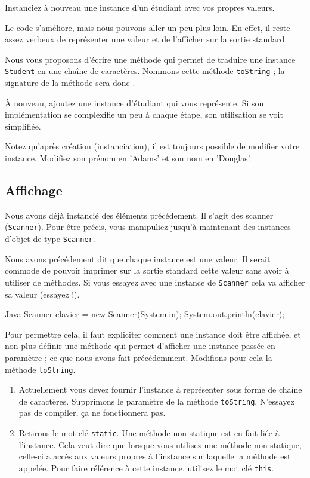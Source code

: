 \documentclass[a4paper,11pt]{article}
\begin{document}

	Instanciez à nouveau une instance d'un étudiant avec vos propres valeurs.

	\bigskip

	Le code s'améliore, mais nous pouvons aller un peu plus loin. En effet, il reste assez verbeux de représenter une valeur et de l'afficher sur la sortie standard.

	Nous vous proposons d'écrire une méthode qui permet de \og traduire\fg{} une
	instance \texttt{Student} en une chaîne de caractères. Nommons cette
	méthode \texttt{toString} ; la signature de la méthode sera donc
	.


	À nouveau, ajoutez une instance d'étudiant qui vous représente. Si son implémentation se complexifie un peu à chaque étape, son utilisation se voit simplifiée.

	Notez qu'après création (instanciation), il est toujours possible de modifier votre instance. Modifiez son prénom en 'Adams' et son nom en 'Douglas'.


	\subsection{Affichage}

	Nous avons déjà instancié des éléments précédement. Il s'agit des scanner
	(\texttt{Scanner}).  Pour être précis, vous manipuliez jusqu'à maintenant
	des instances d'objet de type \texttt{Scanner}.

	Nous avons précédement dit que chaque instance est une valeur. Il serait commode de pouvoir imprimer sur la sortie standard cette valeur sans avoir à utiliser de méthodes. Si vous essayez avec une instance de \texttt{Scanner} cela va afficher sa valeur (essayez !).
	\begin{Code}{Java}
		Scanner clavier = new Scanner(System.in);
		System.out.println(clavier);
	\end{Code}

	Pour permettre cela, il faut expliciter comment une instance doit être affichée, et non plus définir une méthode qui permet d'afficher une instance passée en paramètre ; ce que nous avons fait précédemment. Modifions pour cela la méthode \texttt{toString}. 
	\begin{enumerate}
		\item Actuellement vous devez fournir l'instance à représenter sous forme de chaîne de caractères. Supprimons le paramètre de la méthode \texttt{toString}. N'essayez pas de compiler, ça ne fonctionnera pas.
		\item Retirons le mot clé \texttt{static}. Une méthode non statique est en fait liée à l'instance. Cela veut dire que lorsque vous utilisez une méthode non statique, celle-ci a accès aux valeurs propres à l'instance sur laquelle la méthode est appelée. Pour faire référence à cette instance, utilisez le mot clé \texttt{this}.
	\end{enumerate} 
\end{document}
